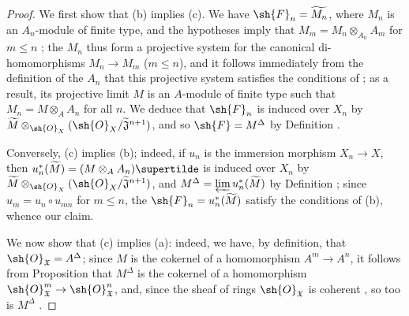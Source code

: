 \begin{proof}
We first show that (b) implies (c).
We have $\sh{F}_n=\widetilde{M_n}$, where $M_n$ is an $A_n$-module of finite type, and the hypotheses imply that $M_m=M_n\otimes_{A_n}A_m$ for $m\leq n$ ; the $M_n$ thus form a projective system for the canonical di-homomorphisms $M_n\to M_m$ ($m\leq n$), and it follows immediately from the definition of the $A_n$ that this projective system satisfies the conditions of ; as a result, its projective limit $M$ is an $A$-module of finite type such that $M_n=M\otimes_A A_n$ for all $n$.
We deduce that $\sh{F}_n$ is induced over $X_n$ by $\widetilde{M}\otimes_{\sh{O}_X}(\sh{O}_X/\widetilde{\mathfrak{J}}^{n+1})$, and so $\sh{F}=M^\Delta$ by Definition .

Conversely, (c) implies (b); indeed, if $u_n$ is the immersion morphism $X_n\to X$, then $u_n^*(\widetilde{M})=(M\otimes_A A_n)\supertilde$ is induced over $X_n$ by $\widetilde{M}\otimes_{\sh{O}_X}(\sh{O}_X/\widetilde{\mathfrak{J}}^{n+1})$, and $M^\Delta=\varprojlim u_n^*(\widetilde{M})$ by Definition ; since $u_m=u_n\circ u_{mn}$ for $m\leq n$, the $\sh{F}_n=u_n^*(\widetilde{M})$ satisfy the conditions of (b), whence our claim.

We now show that (c) implies (a): indeed, we have, by definition, that $\sh{O}_\mathfrak{X}=A^\Delta$; since $M$ is the cokernel of a homomorphism $A^m\to A^n$, it follows from Proposition  that $M^\Delta$ is the cokernel of a homomorphism $\sh{O}_\mathfrak{X}^m\to\sh{O}_\mathfrak{X}^n$, and, since the sheaf of rings $\sh{O}_\mathfrak{X}$ is coherent , so too is $M^\Delta$ .


\end{proof}
